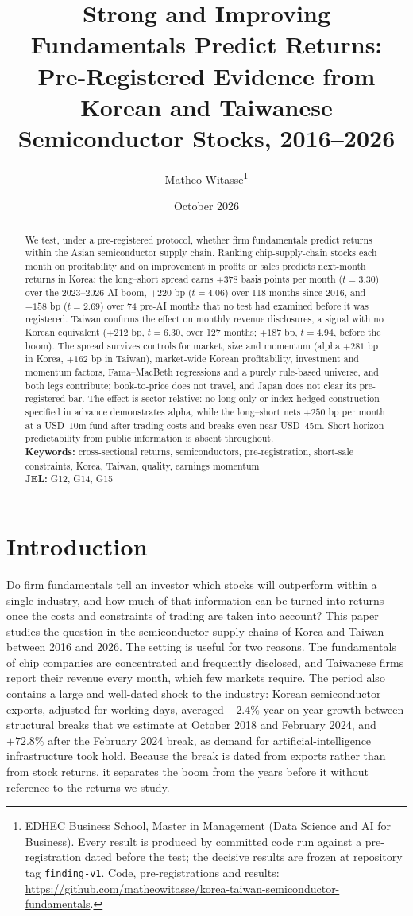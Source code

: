 \documentclass[12pt,a4paper]{article}
\title{\textbf{Strong and Improving Fundamentals Predict Returns:\\Pre-Registered Evidence from Korean and Taiwanese Semiconductor Stocks, 2016--2026}}
\author{Matheo Witasse\thanks{EDHEC Business School, Master in Management (Data Science and AI for Business).
Every result is produced by committed code run against a pre-registration dated before the test; the decisive results
are frozen at repository tag \texttt{finding-v1}. Code, pre-registrations and results:
\url{https://github.com/matheowitasse/korea-taiwan-semiconductor-fundamentals}.}}
\date{October 2026}
\begin{document}
\maketitle

\begin{abstract}
\noindent We test, under a pre-registered protocol, whether firm fundamentals predict returns within the Asian
semiconductor supply chain. Ranking chip-supply-chain stocks each month on profitability and on improvement in profits
or sales predicts next-month returns in Korea: the long--short spread earns $+378$ basis points per month ($t=3.30$)
over the 2023--2026 AI boom, $+220$ bp ($t=4.06$) over 118 months since 2016, and $+158$ bp ($t=2.69$) over 74 pre-AI
months that no test had examined before it was registered. Taiwan confirms the effect on monthly revenue disclosures,
a signal with no Korean equivalent ($+212$ bp, $t=6.30$, over 127 months; $+187$ bp, $t=4.94$, before the boom). The
spread survives controls for market, size and momentum (alpha $+281$ bp in Korea, $+162$ bp in Taiwan),
market-wide Korean profitability, investment and momentum factors, Fama--MacBeth regressions and a purely rule-based
universe, and both legs contribute; book-to-price does not travel, and Japan does not clear
its pre-registered bar. The effect is sector-relative: no long-only or index-hedged construction specified in advance
demonstrates alpha, while the long--short nets $+250$ bp per month at a USD~10m fund after trading costs and breaks
even near USD~45m. Short-horizon predictability from public information is absent throughout.\\[1ex]
\noindent\textbf{Keywords:} cross-sectional returns, semiconductors, pre-registration, short-sale constraints, Korea,
Taiwan, quality, earnings momentum\\
\noindent\textbf{JEL:} G12, G14, G15
\end{abstract}

\clearpage

\section{Introduction}

Do firm fundamentals tell an investor which stocks will outperform within a single industry, and how much of that
information can be turned into returns once the costs and constraints of trading are taken into account? This paper
studies the question in the semiconductor supply chains of Korea and Taiwan between 2016 and 2026. The setting is
useful for two reasons. The fundamentals of chip companies are concentrated and frequently disclosed, and Taiwanese
firms report their revenue every month, which few markets require. The period also contains a large and well-dated
shock to the industry: Korean semiconductor exports, adjusted for working days, averaged $-2.4\%$ year-on-year growth
between structural breaks that we estimate at October 2018 and February 2024, and $+72.8\%$ after the February 2024
break, as demand for artificial-intelligence infrastructure took hold. Because the break is dated from exports rather
than from stock returns, it separates the boom from the years before it without reference to the returns we study.
\end{document}
